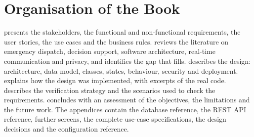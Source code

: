 \section{Organisation of the Book}

 presents the stakeholders, the functional and non-functional requirements, the user
stories, the use cases and the business rules.  reviews the literature on emergency
dispatch, decision support, software architecture, real-time communication and privacy, and identifies the gap
that \ProjectName{} fills.  describes the design: architecture, data model, classes, states,
behaviour, security and deployment.  explains how the design was implemented, with
excerpts of the real code.  describes the verification strategy and the scenarios used to check
the requirements.  concludes with an assessment of the objectives, the limitations and the
future work. The appendices contain the database reference, the REST API reference, further screens, the complete
use-case specifications, the design decisions and the configuration reference.
